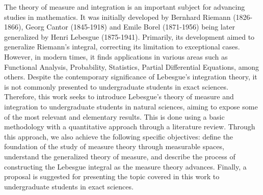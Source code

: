 The theory of measure and integration is an important subject for advancing studies in mathematics. 
It was initially developed by Bernhard Riemann (1826-1866), Georg Cantor (1845-1918) and Emile Borel (1871-1956) being later generalized by Henri Lebesgue (1875-1941). 
Primarily, its development aimed to generalize Riemann's integral, correcting its limitation to exceptional cases. 
However, in modern times, it finds applications in various areas such as Functional Analysis, Probability, Statistics, Partial Differential Equations, among others.
Despite the contemporary significance of Lebesgue's integration theory, it is not commonly presented to undergraduate students in exact sciences. 
Therefore, this work seeks to introduce Lebesgue's theory of measure and integration to undergraduate students in natural sciences, aiming to expose some of the most relevant and elementary results.
This is done using a basic methodology with a quantitative approach through a literature review.
Through this approach, we also achieve the following specific objectives: define the foundation of the study of measure theory through measurable spaces, understand the generalized theory of measure, and describe the process of constructing the Lebesgue integral as the measure theory advances. 
Finally, a proposal is suggested for presenting the topic covered in this work to undergraduate students in exact sciences.

